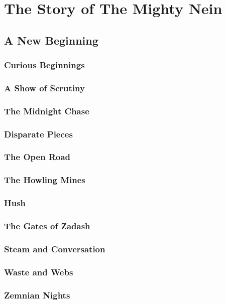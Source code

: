 \section{The Story of The Mighty Nein} \vspace*{\fill}
    \newpage
    
    \newpage
    \subsection{A New Beginning} \vspace*{\fill}
    \newpage
        \subsubsection{Curious Beginnings}
        \subsubsection{A Show of Scrutiny}
        \subsubsection{The Midnight Chase}
        \subsubsection{Disparate Pieces}
        \subsubsection{The Open Road}
        \subsubsection{The Howling Mines}
        \subsubsection{Hush}
        \subsubsection{The Gates of Zadash}
        \subsubsection{Steam and Conversation}
        \subsubsection{Waste and Webs}
        \subsubsection{Zemnian Nights}
